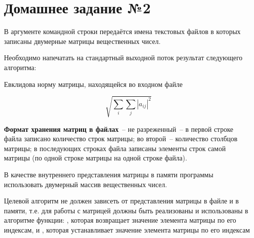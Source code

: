 \section*{Домашнее задание №2}

В аргументе командной строки передаётся имена текстовых файлов
в которых записаны двумерные матрицы
вещественных чисел.

Необходимо напечатать на стандартный выходной
поток результат следующего алгоритма:

Евклидова норму матрицы, находящейся во входном файле

$$
\sqrt{ \sum_i\sum_j{|a_{ij}|^2} }
$$

\textbf{Формат хранения матриц в файлах}~--
не разреженный~-- в первой строке файла записано количество строк
матрицы; во второй~-- количество столбцов матрицы; в последующих
строках файла записаны элементы строк самой матрицы (по одной
строке матрицы на одной строке файла).

В качестве внутреннего представления матрицы в памяти программы
использовать двумерный массив вещественных чисел.

Целевой алгоритм не
должен зависеть от представления матрицы в файле и в памяти, т.е. для
работы с матрицей должны быть реализованы и использованы в алгоритме
функции: , которая возвращает
значение элемента матрицы по его индексам, и , которая устанавливает значение элемента
матрицы по его индексам
